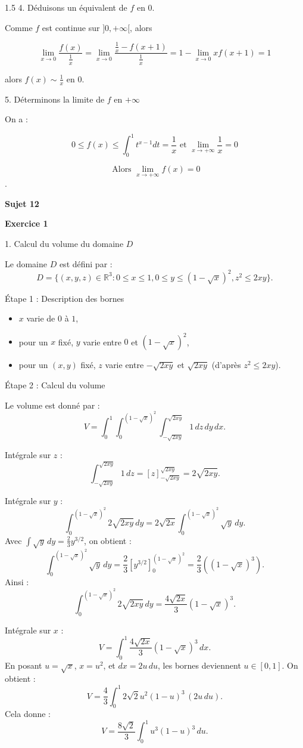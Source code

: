 \documentclass[12pt]{article}
\begin{document}
\begin{spacing}{1.5}
4. Déduisons un équivalent de $f$ en 0.

Comme $f$ est continue sur $]0,+\infty[$, alors 

\[
\lim_{x\to 0}\frac{f(x)}{\frac{1}{x}}=\lim_{x\to 0}\frac{\frac{1}{x}-f(x+1)}{\frac{1}{x}}=1-\lim_{x\to 0}xf(x+1)=1
\]

alors $f(x)\sim \frac{1}{x}$ en 0.


5. Déterminons la limite de $f$ en $+\infty$

On a :

\[
0\leqslant f(x)\leqslant \int_0^1t^{x-1}dt=\frac{1}{x} \text{ et } \lim_{x\to +\infty} \frac{1}{x}=0
\] 

\[\text{ Alors } \lim_{x\to +\infty}f(x)=0\].

\quad
\medskip\textbf{Sujet 12}

\textbf{Exercice 1}


1. Calcul du volume du domaine $D$

Le domaine $D$ est défini par :
\[
D = \{ (x, y, z) \in \mathbb{R}^3 : 0 \leq x \leq 1, 0 \leq y \leq (1 - \sqrt{x})^2, z^2 \leq 2xy \}.
\]

Étape 1 : Description des bornes
\begin{itemize}
    \item $x$ varie de $0$ à $1$,
    \item pour un $x$ fixé, $y$ varie entre $0$ et $(1 - \sqrt{x})^2$,
    \item pour un $(x, y)$ fixé, $z$ varie entre $-\sqrt{2xy}$ et $\sqrt{2xy}$ (d'après $z^2 \leq 2xy$).
\end{itemize}

Étape 2 : Calcul du volume

Le volume est donné par :
\[
V = \int_{0}^{1} \int_{0}^{(1-\sqrt{x})^2} \int_{-\sqrt{2xy}}^{\sqrt{2xy}} 1 \, dz \, dy \, dx.
\]

Intégrale sur $z$ :
\[
\int_{-\sqrt{2xy}}^{\sqrt{2xy}} 1 \, dz = \left[ z \right]_{-\sqrt{2xy}}^{\sqrt{2xy}} = 2\sqrt{2xy}.
\]

Intégrale sur $y$ :
\[
\int_{0}^{(1-\sqrt{x})^2} 2\sqrt{2xy} \, dy = 2\sqrt{2x} \int_{0}^{(1-\sqrt{x})^2} \sqrt{y} \, dy.
\]
Avec $\int \sqrt{y} \, dy = \frac{2}{3} y^{3/2}$, on obtient :
\[
\int_{0}^{(1-\sqrt{x})^2} \sqrt{y} \, dy = \frac{2}{3} \left[ y^{3/2} \right]_{0}^{(1-\sqrt{x})^2} = \frac{2}{3} \left((1-\sqrt{x})^3 \right).
\]
Ainsi :
\[
\int_{0}^{(1-\sqrt{x})^2} 2\sqrt{2xy} \, dy = \frac{4\sqrt{2x}}{3} (1-\sqrt{x})^3.
\]

Intégrale sur $x$ :
\[
V = \int_{0}^{1} \frac{4\sqrt{2x}}{3} (1-\sqrt{x})^3 \, dx.
\]
En posant $u = \sqrt{x}$, $x = u^2$, et $dx = 2u \, du$, les bornes deviennent $u \in [0, 1]$. On obtient :
\[
V = \frac{4}{3} \int_{0}^{1} 2\sqrt{2} u^2 (1-u)^3 \, (2u \, du).
\]
Cela donne :
\[
V = \frac{8\sqrt{2}}{3} \int_{0}^{1} u^3 (1-u)^3 \, du.
\]


\end{spacing}
\end{document}
